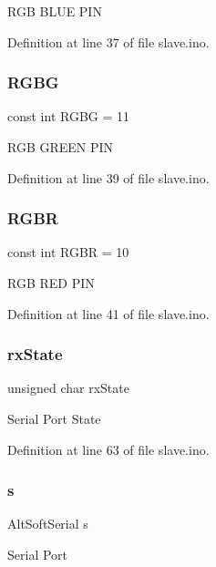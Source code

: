 R\+GB B\+L\+UE P\+IN 

Definition at line 37 of file slave.\+ino.

\mbox{\label{slave_8ino_a02d9fe1f47725a923b1a53dd384f155a}} 
\subsubsection{\texorpdfstring{RGBG}{RGBG}}
{\footnotesize\ttfamily const int R\+G\+BG = 11}

R\+GB G\+R\+E\+EN P\+IN 

Definition at line 39 of file slave.\+ino.

\mbox{\label{slave_8ino_a5bc0cd51e9659b02a8f4ab34bbe1e827}} 
\subsubsection{\texorpdfstring{RGBR}{RGBR}}
{\footnotesize\ttfamily const int R\+G\+BR = 10}

R\+GB R\+ED P\+IN 

Definition at line 41 of file slave.\+ino.

\mbox{\label{slave_8ino_a1384985077089723c6b018e994fbfb24}} 
\subsubsection{\texorpdfstring{rxState}{rxState}}
{\footnotesize\ttfamily unsigned char rx\+State}

Serial Port State 

Definition at line 63 of file slave.\+ino.

\mbox{\label{slave_8ino_a104b9456ac0168a4fc542c36d0d6e5c0}} 
\subsubsection{\texorpdfstring{s}{s}}
{\footnotesize\ttfamily Alt\+Soft\+Serial s}

Serial Port 

